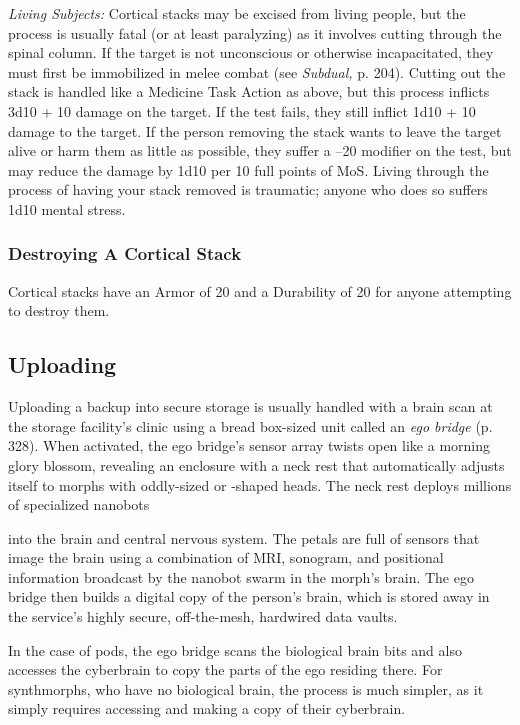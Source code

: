 \textit{Living Subjects:} Cortical stacks may be excised from living people, but the process is usually fatal (or at least paralyzing) as it involves cutting through the spinal column. If the target is not unconscious or otherwise incapacitated, they must first be immobilized in melee combat (see \textit{Subdual,} p. 204). Cutting out the stack is handled like a Medicine Task Action as above, but this process inflicts 3d10 + 10 damage on the target. If the test fails, they still inflict 1d10 + 10 damage to the target. If the person removing the stack wants to leave the target alive or harm them as little as possible, they suffer a –20 modifier on the test, but may reduce the damage by 1d10 per 10 full points of MoS. Living through the process of having your stack removed is traumatic; anyone who does so suffers 1d10 mental stress. 

\subsubsection{Destroying A Cortical Stack} 

Cortical stacks have an Armor of 20 and a Durability of 20 for anyone attempting to destroy them. 

\subsection{Uploading} 

Uploading a backup into secure storage is usually handled with a brain scan at the storage facility's clinic using a bread box-sized unit called an \textit{ego bridge} (p. 328). When activated, the ego bridge's sensor array twists open like a morning glory blossom, revealing an enclosure with a neck rest that automatically adjusts itself to morphs with oddly-sized or -shaped heads. The neck rest deploys millions of specialized nanobots 

into the brain and central nervous system. The petals are full of sensors that image the brain using a combination of MRI, sonogram, and positional information broadcast by the nanobot swarm in the morph's brain. The ego bridge then builds a digital copy of the person's brain, which is stored away in the service's highly secure, off-the-mesh, hardwired data vaults. 

In the case of pods, the ego bridge scans the biological brain bits and also accesses the cyberbrain to copy the parts of the ego residing there. For synthmorphs, who have no biological brain, the process is much simpler, as it simply requires accessing and making a copy of their cyberbrain. 

